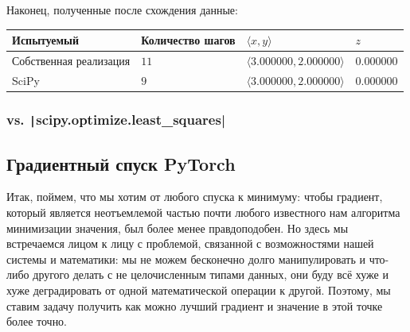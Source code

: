 \documentclass[12pt, a4paper, oneside, final]{article}
\begin{document}
	Наконец, полученные после схождения данные:
	\begin{table}[H]
		\centering
		\begin{tabular}{l|l|l|l}
			Испытуемый & Количество шагов & $\langle x, y \rangle$ & $z$ \\ \hline
			Собственная реализация & $11$ & $\langle 3.000000, 2.000000 \rangle$ & $0.000000$ \\
			SciPy & $9$ & $\langle 3.000000, 2.000000 \rangle$ & $0.000000$
		\end{tabular}
	\end{table}
	\subsubsection*{vs. \texttt|scipy.optimize.least_squares|}
	\subsection*{Градиентный спуск PyTorch}
	Итак, поймем, что мы хотим от любого спуска к минимуму: чтобы градиент, который является неотъемлемой частью почти любого известного нам алгоритма минимизации значения, был более менее правдоподобен.
	Но здесь мы встречаемся лицом к лицу с проблемой, связанной с возможностями нашей системы и математики: мы не можем бесконечно долго манипулировать и что-либо другого делать с не целочисленным типами данных, они буду всё хуже и хуже деградировать от одной математической операции к другой.
	Поэтому, мы ставим задачу получить как можно лучший градиент и значение в этой точке более точно.
\end{document}
